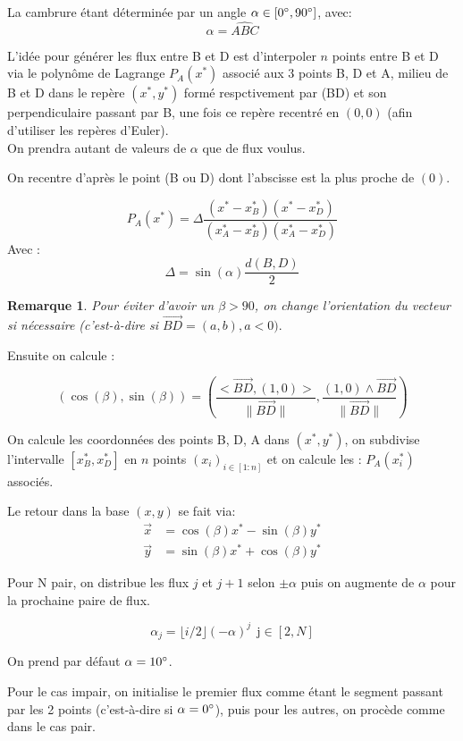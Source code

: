 \documentclass{article}
\newtheorem{remark}{Remarque}
\newcommand{\floor}[1]{\lfloor #1 \rfloor}
\begin{document}
La cambrure étant déterminée par un angle $\alpha \in [0\degree,90\degree]$, avec:
\[ \alpha= \widehat{ABC} \]

L'idée pour générer les flux entre B et D est d'interpoler $n$ points entre B et D via le polynôme de Lagrange $P_{A}(x^{*})$ associé aux 3 points B, D et A, milieu de B et D dans le repère $(x^*, y^*)$ formé respctivement par (BD) et son perpendiculaire passant par B, une fois ce repère recentré en $(0,0)$ (afin d'utiliser les repères d'Euler).\\
On prendra autant de valeurs de $\alpha$ que de flux voulus.

On recentre d'après le point (B ou D) dont l'abscisse est la plus proche de $(0)$.

\[ P_{A}(x^{*})=\Delta \frac{(x^{*}-x_{B}^{*})(x^{*}-x_{D}^{*})}{(x_{A}^{*}-x_{B}^{*})(x_{A}^{*}-x_{D}^{*})} \]
Avec :
\[ \Delta= \sin(\alpha) \frac{d(B,D)}{2} \]

\begin{remark}
Pour éviter d'avoir un $\beta>90$, on change l'orientation du vecteur si nécessaire (c'est-à-dire si $\overrightarrow{BD}=(a,b), a<0).$
\end{remark}
Ensuite on calcule  :
\begin{center}
\[ (\cos(\beta),\sin(\beta))= \left(\frac{<\overrightarrow{BD},(1,0)>}{\| \overrightarrow{BD} \|},\frac{(1,0) \wedge \overrightarrow{BD}}{\| \overrightarrow{BD} \|}\right) \]
\end{center}
On calcule les coordonnées des points B, D, A dans $(x^{*},y^{*})$, on subdivise l'intervalle $[x_B^*,x_D^*]$ en $n$ points $(x_i)_{i \in [1:n]}$ et on calcule les :
$P_A(x_i^*)$ associés.

Le retour dans la base $(x,y)$ se fait via:
\begin{align*}
 \vec{x}& = \cos(\beta) x^* -\sin(\beta) y^*  \\
    \vec{y}& = \sin(\beta)x^* + \cos(\beta) y^* 
\end{align*}

Pour N pair, on distribue les flux $j$ et $j+1$ selon $\pm \alpha$ puis on augmente de $\alpha$ pour la prochaine paire de flux.
\begin{center}
\[ \alpha_j=  \floor{i/2} (-\alpha)^{j} \ \ \text{j} \in [2,N] \]
\end{center}
On prend par défaut $\alpha=10\degree$.

Pour le cas impair, on initialise le premier flux comme étant le segment passant par les 2 points (c'est-à-dire si $\alpha=0\degree$), puis pour les autres, on procède comme dans le cas pair.
\end{document}
